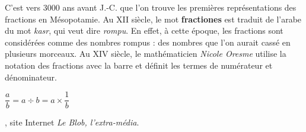 \vspace*{-7mm}

\vspace*{-3mm}
\begin{debat} 
   C'est vers 3000 ans avant J.-C. que l'on trouve les premières représentations des fractions en Mésopotamie. Au {\small XII} siècle, le mot {\bf fractiones} est traduit de l'arabe du mot {\it kasr}, qui veut dire {\it rompu}. En effet, à cette époque, les fractions sont considérées comme des nombres rompus : des nombres que l'on aurait cassé en plusieurs morceaux. Au {\small XIV} siècle, le mathématicien {\it Nicole Oresme} utilise la notation des fractions avec la barre et définit les termes de numérateur et dénominateur.
   \begin{center}
      \textcolor{B1}{\fontsize{30}{30}\selectfont $\dfrac{a}{b} =a\div b =a\times\dfrac{1}{b}$}
   \end{center}
   \bigskip
   \begin{cadre}[B2][F4]
      \begin{center}
         , site Internet {\it Le Blob, l'extra-média}.
      \end{center}
   \end{cadre}
\end{debat}
